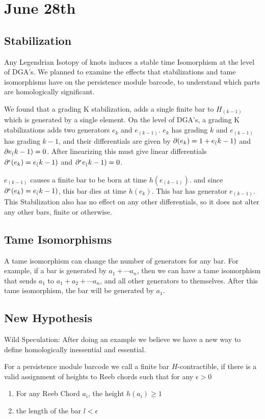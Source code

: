 \documentclass[11pt,oneside]{amsart}
\begin{document}
\section{June 28th}

\subsection{Stabilization}

    Any Legendrian Isotopy of knots induces a stable time Isomorphism at the level of DGA's.  We planned to examine the effects that stabilizations and tame isomorphisms have on the persistence module barcode, to understand which parts are homologically significant. 
    
    We found that a grading K stabilization, adds a single finite bar to $H_(k-1)$ which is generated by a single element. On the level of DGA's, a grading K stabilizations adds two generators $e_k$ and $e_(k-1)$. $e_k$ has grading $k$ and $e_(k-1)$ has grading $k-1$, and their differentials are given by $\partial (e_k) = 1 + e_(k-1)$ and $\partial e_(k-1) = 0$. After linearizing this must give linear differentials $\partial^\epsilon (e_k) = e_(k-1)$ and $\partial^\epsilon e_(k-1) = 0$. 

    $e_(k-1)$ causes a finite bar to be born at time $h(e_(k-1))$. and since $\partial^\epsilon (e_k) = e_(k-1)$, this bar dies at time $h(e_k)$. This bar has generator $e_(k-1)$. This Stabilization also has no effect on any other differentials, so it does not alter any other bars, finite or otherwise.

\subsection{Tame Isomorphisms}

    A tame isomorphism can change the number of generators for any bar. For example, if a bar is generated by $a_1 + \cdots a_n$, then we can have a tame isomorphism that sends $a_1$ to $a_1 + a_2 + \cdots a_n$, and all other generators to themselves. After this tame isomorphism, the bar will be generated by $a_1$.

\subsection{New Hypothesis}

Wild Speculation:
    After doing an example we believe we have a new way to define homologically inessential and essential.

    \begin{definition}
        For a persistence module barcode we call a finite bar $H$-contractible, if there is a valid assignment of heights to Reeb chords such that for any $\epsilon > 0$
        \begin{enumerate}
            \item For any Reeb Chord $a_i$, the height $h(a_i) \geq 1$
            \item the length of the bar $l < \epsilon$
        \end{enumerate}
    \end{definition}
\end{document}
